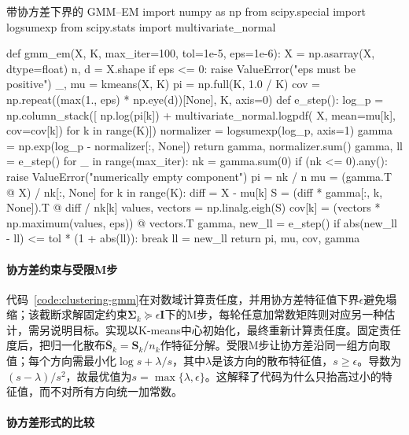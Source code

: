 \begin{codeblock}[language=Python,label={code:clustering-gmm}]{带协方差下界的 GMM--EM}
import numpy as np
from scipy.special import logsumexp
from scipy.stats import multivariate_normal

def gmm_em(X, K, max_iter=100, tol=1e-5, eps=1e-6):
    X = np.asarray(X, dtype=float)
    n, d = X.shape
    if eps <= 0:
        raise ValueError("eps must be positive")
    _, mu = kmeans(X, K)
    pi = np.full(K, 1.0 / K)
    cov = np.repeat((max(1., eps) * np.eye(d))[None], K, axis=0)
    def e_step():
        log_p = np.column_stack([
            np.log(pi[k]) + multivariate_normal.logpdf(
                X, mean=mu[k], cov=cov[k])
            for k in range(K)])
        normalizer = logsumexp(log_p, axis=1)
        gamma = np.exp(log_p - normalizer[:, None])
        return gamma, normalizer.sum()
    gamma, ll = e_step()
    for _ in range(max_iter):
        nk = gamma.sum(0)
        if (nk <= 0).any():
            raise ValueError("numerically empty component")
        pi = nk / n
        mu = (gamma.T @ X) / nk[:, None]
        for k in range(K):
            diff = X - mu[k]
            S = (diff * gamma[:, k, None]).T @ diff / nk[k]
            values, vectors = np.linalg.eigh(S)
            cov[k] = (vectors * np.maximum(values, eps)) @ vectors.T
        gamma, new_ll = e_step()
        if abs(new_ll - ll) <= tol * (1 + abs(ll)):
            break
        ll = new_ll
    return pi, mu, cov, gamma
\end{codeblock}

\paragraph{协方差约束与受限M步}

代码~\ref{code:clustering-gmm}在对数域计算责任度，并用协方差特征值下界$\epsilon$避免塌缩；该截断求解固定约束$\bm{\Sigma}_k\succeq\epsilon\bm{I}$下的M步，每轮任意加常数矩阵则对应另一种估计，需另说明目标。实现以K-means中心初始化，最终重新计算责任度。固定责任度后，把归一化散布$\bar{\bm S}_k=\bm S_k/n_k$作特征分解。受限M步让协方差沿同一组方向取值；每个方向需最小化$\log s+\lambda/s$，其中$\lambda$是该方向的散布特征值，$s\geq\epsilon$。导数为$(s-\lambda)/s^2$，故最优值为$s=\max\{\lambda,\epsilon\}$。这解释了代码为什么只抬高过小的特征值，而不对所有方向统一加常数。

\paragraph{协方差形式的比较}


